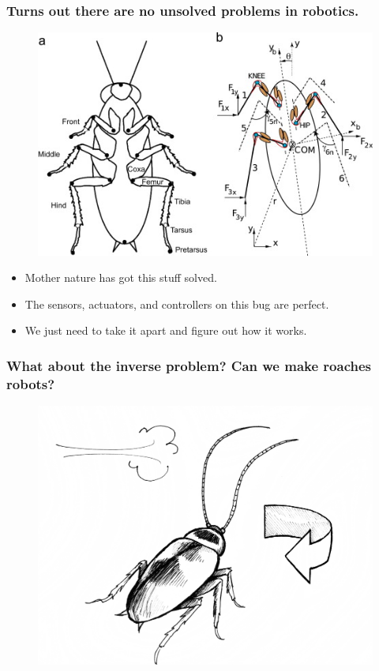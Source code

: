 \documentclass[compress]{beamer}
\begin{document}
\begin{frame}
  \frametitle{Turns out there are no unsolved problems in robotics.}
  \begin{figure}
    \includegraphics[width=0.6\linewidth]{roach.jpg}
  \end{figure}     
  \begin{itemize}
    \item Mother nature has got this stuff solved. 
    \item The sensors, actuators, and controllers on this bug are perfect.
    \item We just need to take it apart and figure out how it works. 
  \end{itemize}
\end{frame}
\begin{frame}
  \frametitle{What about the inverse problem? Can we make roaches robots?}
  \begin{figure}
    \includegraphics[width=0.8\linewidth]{wind.jpg}
  \end{figure}     
\end{frame}
\end{document}
